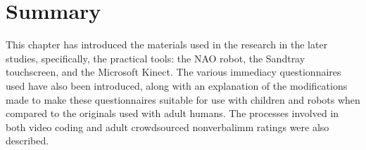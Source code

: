\section{Summary}\label{sec:method-summary}
This chapter has introduced the materials used in the research in the later studies, specifically, the practical tools: the NAO robot, the Sandtray touchscreen, and the Microsoft Kinect. The various \gls{immediacy} questionnaires used have also been introduced, along with an explanation of the modifications made to make these questionnaires suitable for use with children and robots when compared to the originals used with adult humans. The processes involved in both video coding and adult crowdsourced \gls{nonverbalimm} ratings were also described.